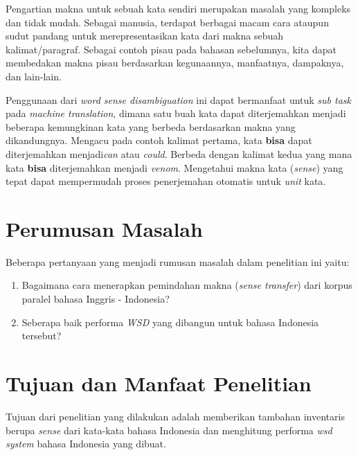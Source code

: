 Pengartian makna untuk sebuah kata sendiri merupakan masalah yang kompleks dan tidak mudah. Sebagai manusia, terdapat berbagai macam cara ataupun sudut pandang untuk merepresentasikan kata dari makna sebuah kalimat/paragraf. Sebagai contoh pisau pada bahasan sebelumnya, kita dapat membedakan makna pisau berdasarkan kegunaannya, manfaatnya, dampaknya, dan lain-lain.

Penggunaan dari \textit{word sense disambiguation} ini dapat bermanfaat untuk \textit{sub task} pada \textit{machine translation}, dimana satu buah kata dapat diterjemahkan menjadi beberapa kemungkinan kata yang berbeda berdasarkan makna yang dikandungnya. Mengacu pada contoh kalimat pertama, kata \textbf{bisa} dapat diterjemahkan menjadi\textit{can} atau \textit{could}. Berbeda dengan kalimat kedua yang mana kata \textbf{bisa} diterjemahkan menjadi \textit{venom}. Mengetahui makna kata (\textit{sense}) yang tepat dapat mempermudah proses penerjemahan otomatis untuk \textit{unit} kata.

\section{Perumusan Masalah}
Beberapa pertanyaan yang menjadi rumusan masalah dalam penelitian ini yaitu:
\begin{enumerate}
	\item Bagaimana cara menerapkan pemindahan makna (\textit{sense transfer}) dari korpus paralel bahasa Inggris - Indonesia?
	\item Seberapa baik performa \textit{WSD} yang dibangun untuk bahasa Indonesia tersebut?
\end{enumerate}

\section{Tujuan dan Manfaat Penelitian}
Tujuan dari penelitian yang dilakukan adalah memberikan tambahan inventaris berupa \textit{sense} dari kata-kata bahasa Indonesia dan menghitung performa \textit{wsd system} bahasa Indonesia yang dibuat.


